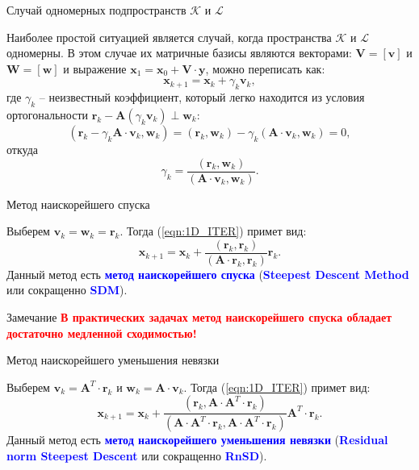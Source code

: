 \documentclass[10pt,xcolor=pst,aspectratio=169]{beamer}
\begin{document}
\begin{frame}{Случай одномерных подпространств $\mathcal{K}$ и $\mathcal{L}$}

	\transdissolve[duration=0.2]
	\justifying
	\large
	Наиболее простой ситуацией является случай, когда пространства $\mathcal{K}$ и $\mathcal{L}$ одномерны. В этом случае их матричные базисы являются векторами: $\textbf{V} = [\textbf{v}]$ и $\textbf{W} = [\textbf{w}]$ и выражение $\textbf{x}_{1} = \textbf{x}_{0} + \textbf{V} \cdot \textbf{y}$, можно переписать как:
	\begin{equation}
		\textbf{x}_{k+1} = \textbf{x}_{k} + \gamma_{k} \textbf{v}_{k},
		\label{eqn:1D_ITER}
	\end{equation}
	где $\gamma_{k}$ -- неизвестный коэффициент, который легко находится из условия ортогональности $\textbf{r}_{k} - \textbf{A} (\gamma_{k} \textbf{v}_{k}) \perp \textbf{w}_{k}$:
	\[
		(\textbf{r}_{k} - \gamma_{k} \textbf{A} \cdot \textbf{v}_{k} , \textbf{w}_{k}) = (\textbf{r}_{k} , \textbf{w}_{k}) - \gamma_{k} (\textbf{A} \cdot \textbf{v}_{k} , \textbf{w}_{k}) = 0,
	\]
	откуда
	\[
		\gamma_{k} = \frac{(\textbf{r}_{k} , \textbf{w}_{k})}{(\textbf{A} \cdot \textbf{v}_{k} , \textbf{w}_{k})}.
	\]

\end{frame}

\begin{frame}{Метод наискорейшего спуска}

	\transdissolve[duration=0.2]
	\justifying
	\large
	Выберем $\textbf{v}_{k} = \textbf{w}_{k} = \textbf{r}_{k}$. Тогда (\ref{eqn:1D_ITER}) примет вид:
	\[
		\textbf{x}_{k+1} = \textbf{x}_{k} + \frac{(\textbf{r}_{k} , \textbf{r}_{k})}{(\textbf{A} \cdot \textbf{r}_{k} , \textbf{r}_{k})} \textbf{r}_{k}.
	\]
	Данный метод есть \textbf{\textcolor{blue}{метод наискорейшего спуска}} (\textbf{\textcolor{blue}{Steepest Descent Method}} или сокращенно \textbf{\textcolor{blue}{SDM}}).\pause
	\begin{block}{Замечание}
		\justifying
		\textbf{\textcolor{red}{В практических задачах метод наискорейшего спуска обладает достаточно медленной сходимостью!}}
	\end{block}

\end{frame}

\begin{frame}{Метод наискорейшего уменьшения невязки}

	\transdissolve[duration=0.2]
	\justifying
	\large
	Выберем $\textbf{v}_{k} = \textbf{A}^{T} \cdot \textbf{r}_{k}$ и $\textbf{w}_{k} = \textbf{A} \cdot \textbf{v}_{k}$. Тогда (\ref{eqn:1D_ITER}) примет вид:
	\[
		\textbf{x}_{k+1} = \textbf{x}_{k} + \frac{(\textbf{r}_{k} , \textbf{A} \cdot \textbf{A}^{T} \cdot \textbf{r}_{k})}{(\textbf{A} \cdot \textbf{A}^{T} \cdot \textbf{r}_{k} , \textbf{A} \cdot \textbf{A}^{T} \cdot \textbf{r}_{k})} \textbf{A}^{T} \cdot \textbf{r}_{k}.
	\]
	Данный метод есть \textbf{\textcolor{blue}{метод наискорейшего уменьшения невязки}} (\textbf{\textcolor{blue}{Residual norm Steepest Descent}} или сокращенно \textbf{\textcolor{blue}{RnSD}}).

\end{frame}
\end{document}

